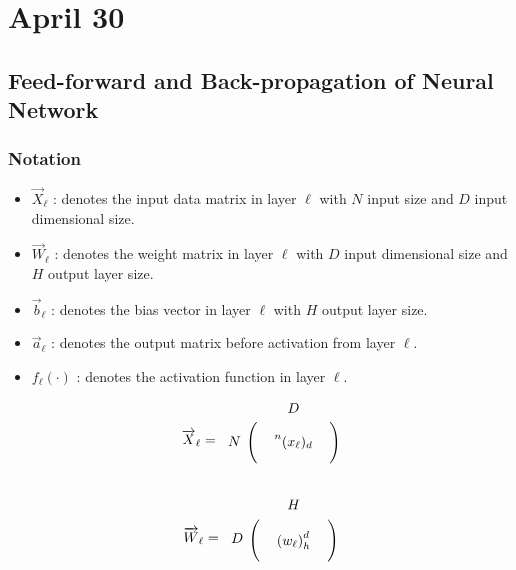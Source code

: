 \documentclass[12pt,a4paper]{article}%
\theoremstyle{definition}
\theoremstyle{plain}
\numberwithin{equation}{section}
\begin{document}
\section{April 30}
\subsection{Feed-forward and Back-propagation of Neural Network}
\subsubsection{Notation}
\begin{itemize}
\item $\overrightarrow{X}_{\ell}$ : denotes the input data matrix in layer $\ell$ with $N$ input size and $D$ input dimensional size.  
\item $\overrightarrow{W}_{\ell}$ : denotes the weight matrix in layer $\ell$ with $D$ input dimensional size and $H$ output layer size.
\item $\vec{b}_{\ell}$ : denotes the bias vector in layer $\ell$ with $H$ output layer size.
\item $\overrightarrow{a}_{\ell}$ : denotes the output matrix before activation from layer $\ell$.
\item $f_{\ell}(\cdot)$ : denotes the activation function in layer $\ell$. 
\end{itemize}

\begin{equation*}
\overrightarrow{X}_{\ell} =  \begin{blockarray}{cccc}
                                     & \multicolumn{3}{c}{$D$}  \\
\begin{block}{c(ccc)}
\multirow{3}{*}{$N$} &    &       &    \\
  					                 &      &  \prescript{n}{}{(x_{\ell})}_{d}     &     \\
			     	                 &      &       &       \\
\end{block}
\end{blockarray}
\end{equation*}

\begin{equation*}
\overrightarrow{W}_{\ell} =  \begin{blockarray}{cccc}
                                     & \multicolumn{3}{c}{$H$}  \\
\begin{block}{c(ccc)}
\multirow{3}{*}{$D$} &    &       &    \\
  					                 &      &  {(w_{\ell})}^{d}_{h}     &     \\
			     	                 &      &       &       \\
\end{block}
\end{blockarray}
\end{equation*}
\end{document}
